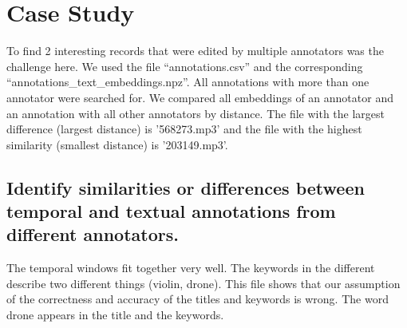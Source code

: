 
\section{Case Study}
\label{sec:Case Study}

To find 2 interesting records that were edited by multiple annotators was the challenge here. 
We used the file ``annotations.csv'' and the corresponding ``annotations\_text\_embeddings.npz''. 
All annotations with more than one annotator were searched for. 
We compared all embeddings of an annotator and an annotation with all other annotators by distance.
The file with the largest difference (largest distance) is '568273.mp3' and the file with the highest similarity (smallest distance) is '203149.mp3'.

\subsection{Identify similarities or differences between temporal and textual annotations from different annotators.}
\label{sec:Case Study:a}

The temporal windows fit together very well. The keywords in the different describe two different things (violin, drone).
This file shows that our assumption of the correctness and accuracy of the titles and keywords is wrong. 
The word drone appears in the title and the keywords.

